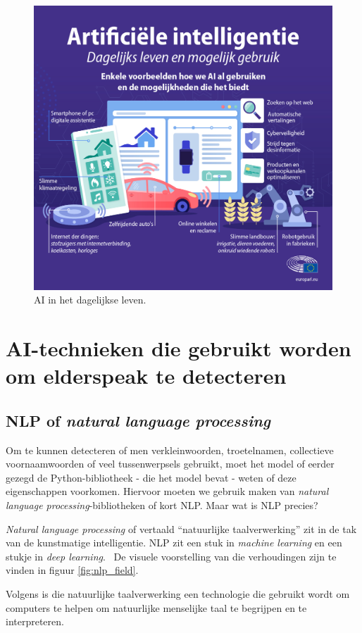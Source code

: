 \begin{figure}
    \centering
    \includegraphics[width=.8\textwidth]{./img/ai_voorbeelden}
    \caption{\label{fig:ai_dagelijkse_leven} AI in het dagelijkse leven.~\autocite{EuropeesParlement2020}}
\end{figure}

\section{AI-technieken die gebruikt worden om elderspeak te detecteren}

\subsection{NLP of \textit{natural language processing}}
Om te kunnen detecteren of men verkleinwoorden, troetelnamen, collectieve voornaamwoorden of veel tussenwerpsels gebruikt, moet het model of eerder gezegd de Python-bibliotheek - die het model bevat - weten of deze eigenschappen voorkomen. Hiervoor moeten we gebruik maken van \textit{natural language processing}-bibliotheken of kort NLP. Maar wat is NLP precies?

\textit{Natural language processing} of vertaald ``natuurlijke taalverwerking'' zit in de tak van de kunstmatige intelligentie. NLP zit een stuk in \textit{machine learning} en een stukje in \textit{deep learning}.~\autocite{Kleinings2022} De visuele voorstelling van die verhoudingen zijn te vinden in figuur \ref{fig:nlp_field}.

Volgens \textcite{Kleinings2022} is die natuurlijke taalverwerking een technologie die gebruikt wordt om computers te helpen om natuurlijke menselijke taal te begrijpen en te interpreteren.

